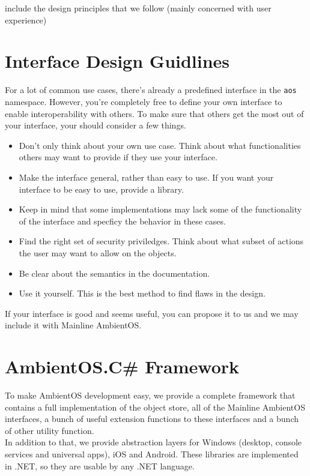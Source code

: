 \documentclass[a4paper]{article}
\begin{document}
{\q include the design principles that we follow (mainly concerned with user experience)}


\section{Interface Design Guidlines} \label{sec:if-guide}

For a lot of common use cases, there's already a predefined interface in the {\tt aos} namespace. However, you're completely free to define your own interface to enable interoperability with others. To make sure that others get the most out of your interface, your should consider a few things.

\begin{itemize}
  \item Don't only think about your own use case. Think about what functionalities others may want to provide if they use your interface.
  \item Make the interface general, rather than easy to use. If you want your interface to be easy to use, provide a library.
  \item Keep in mind that some implementations may lack some of the functionality of the interface and specficy the behavior in these cases.
  \item Find the right set of security priviledges. Think about what subset of actions the user may want to allow on the objects.
  \item Be clear about the semantics in the documentation.
  \item Use it yourself. This is the best method to find flaws in the design.
\end{itemize}

If your interface is good and seems useful, you can propose it to us and we may include it with Mainline AmbientOS.



\section{AmbientOS.C\# Framework}

To make AmbientOS development easy, we provide a complete framework that contains a full implementation of the object store, all of the Mainline AmbientOS interfaces, a bunch of useful extension functions to these interfaces and a bunch of other utility function. \\
In addition to that, we provide abstraction layers for Windows (desktop, console services and universal apps), iOS and Android. These libraries are implemented in .NET, so they are usable by any .NET language. \\
\end{document}
